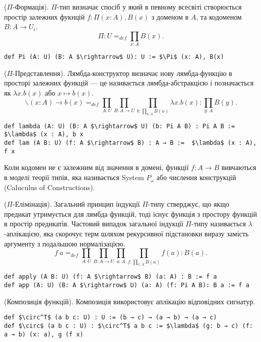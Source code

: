 \begin{definition} ($\Pi$-Формація). $\Pi$-тип визначає спосіб у який
в певному всесвіті створюється простір залежних фукнцій $f: \Pi(x:A), B(x)$ з
доменом в $A$, та кодоменом $B: A \rightarrow U_i$.
$$\Pi : U =_{def} \prod_{x:A}B(x).$$
\begin{lstlisting}
def Pi (A: U) (B: A $\rightarrow$ U): U := $\Pi$ (x: A), B(x)
\end{lstlisting}
\end{definition}

\begin{definition} ($\Pi$-Представлення). Лямбда-конструктор визначає
нову лямбда-функцію в просторі залежних функцій — це називається
лямбда-абстракцією і позначається як $\lambda x. b(x)$ або $x \mapsto b(x)$.
$$\backslash (x: A) \rightarrow b(x) =_{def} \prod_{A:U}\prod_{B:A \rightarrow U}\prod_{b:\prod_{a:A}B(a)}\lambda x.b(x) : \prod_{y:A}B(y).$$
\begin{lstlisting}
def lambda (A: U) (B: A $\rightarrow$ U) (b: Pi A B) : Pi A B := $\lambda$ (x : A), b x
def lam (A B: U) (f: A $\rightarrow$ B) : A → B :=  $\lambda$ (x : A), f x
\end{lstlisting}
\end{definition}
Коли кодомен не є залежним від значення в домені, функції $f: A \rightarrow B$ вивчаються в моделі теорії типів,
яка називається System $P_\omega$ або числення конструкцій (Caluculus of Constructions).

\newpage
\begin{definition} ($\Pi$-Елімінація). Загальний принцип індукції $\Pi$-типу стверджує, що якщо предикат утримується
для лямбда функцій, тоді існує функція з простору функцій в простір предикатів. Частовий випадок загальної індукції
$\Pi$-типу називається $\lambda$-аплікацією, яка скорочує терм шляхом рекурсивної підстановки виразу замість аргументу з
подальшою нормалізацією.
$$f\ a =_{def} \prod_{A:U}\prod_{B: A \rightarrow U}\prod_{a:A}\prod_{f: \prod_{x:A}B(a)}f(a) : B(a).$$
\begin{lstlisting}
def apply (A B: U) (f: A $\rightarrow$ B) (a: A) : B := f a
def app (A: U) (B: A $\rightarrow$ U) (a: A) (f: Pi A B): B a := f a
\end{lstlisting}
\end{definition}

\begin{definition} (Композиція функцій). Композиція використовує аплікацію відповідних сигнатур.
\begin{lstlisting}
def $\circ^T$ (a b c: U) : U := (b → c) → (a → b) → (a → c)
def $\circ$ (a b c : U) : $\circ^T$ a b c := $\lambda$ (g: b → c) (f: a → b) (x: a), g (f x)
\end{lstlisting}
\end{definition}

